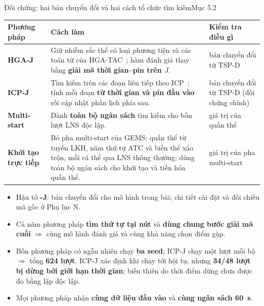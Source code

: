 \documentclass[aspectratio=169,10pt,t,xcolor={table}]{beamer}
\newcommand{\src}[1]{\hfill{\normalfont\footnotesize\color{white!62!navy}#1}}  %
\begin{document}
\begin{frame}{Đối chứng: hai bản chuyển đổi và hai cách tổ chức tìm kiếm\src{Mục 5.2}}
\scriptsize
\renewcommand{\arraystretch}{1.25}
\begin{tabularx}{\textwidth}{@{}P{2.6cm}YP{3.3cm}@{}}
\toprule
\textbf{Phương pháp} & \textbf{Cách làm} & \textbf{Kiểm tra điều gì}\\\midrule
\textbf{HGA-J} & Giữ nhiễm sắc thể có loại phương tiện và các toán tử của HGA-TAC~\cite{hgatac2024}; hàm đánh giá thay bằng \textbf{giải mã thời gian--pin trên $J$}. & bản chuyển đổi từ TSP-D\\
\textbf{ICP-J} & Tìm kiếm trên các đoạn liên tiếp theo ICP~\cite{lee2025}; tính mỗi đoạn \textbf{từ thời gian và pin đầu vào} rồi cập nhật phần lịch phía sau. & bản chuyển đổi từ TSP-D (đối chứng chính)\\
\textbf{Multi-start} & Dành \textbf{toàn bộ ngân sách} tìm kiếm cho bốn lượt LNS độc lập. & giá trị của quần thể\\
\textbf{Khởi tạo trực tiếp} & Bỏ pha multi-start của GEMS: quần thể từ tuyến LKH, năm thứ tự ATC và biến thể xáo trộn, mỗi cá thể qua LNS thông thường; dùng toàn bộ ngân sách cho khởi tạo và tiến hóa quần thể. & giá trị của pha multi-start\\
\bottomrule
\end{tabularx}
\vspace{4pt}
\begin{itemize}\scriptsize
\item Hậu tố \textbf{-J}: bản chuyển đổi cho mô hình trong bài; chi tiết cài đặt và đối chiếu mã gốc ở Phụ lục N.
\item Cả năm phương pháp \textbf{tìm thứ tự tại nút} và \textbf{dùng chung bước giải mã cuối} $\Rightarrow$ cùng mô hình đánh giá và cùng khả năng chọn điểm gặp.
\item Bốn phương pháp có ngẫu nhiên chạy \textbf{ba seed}; ICP-J chạy một lượt mỗi bộ $\Rightarrow$ tổng \textbf{624 lượt}. ICP-J xác định khi chạy tới hội tụ, nhưng \textbf{34/48 lượt bị dừng bởi giới hạn thời gian}; biến thiên do thời điểm dừng chưa được đo bằng lặp độc lập.
\item Mọi phương pháp nhận \textbf{cùng dữ liệu đầu vào} và \textbf{cùng ngân sách 60~s}.
\end{itemize}
\end{frame}
\end{document}
